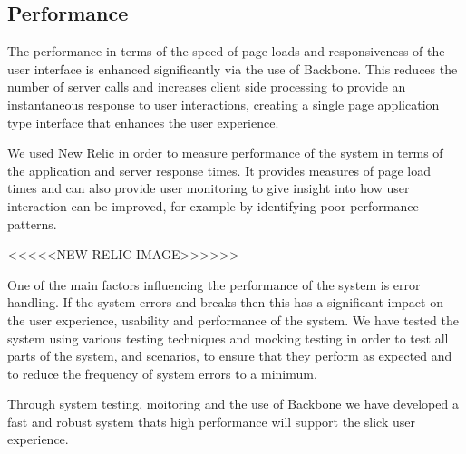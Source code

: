 \subsection{Performance}
The performance in terms of the speed of page loads and responsiveness of the user interface is enhanced significantly via the use of Backbone. This reduces the number of server calls and increases client side processing to provide an instantaneous response to user interactions, creating a single page application type interface that enhances the user experience. 

We used New Relic in order to measure performance of the system in terms of the application and server response times. It provides measures of page load times and can also provide user monitoring to give insight into how user interaction can be improved, for example by identifying poor performance patterns.

<<<<<NEW RELIC IMAGE>>>>>>

One of the main factors influencing the performance of the system is error handling. If the system errors and breaks then this has a significant impact on the user experience, usability and performance of the system. We have tested the system using various testing techniques and mocking testing in order to test all parts of the system, and scenarios, to ensure that they perform as expected and to reduce the frequency of system errors to a minimum.

Through system testing, moitoring and the use of Backbone we have developed a fast and robust system thats high performance will support the slick user experience.